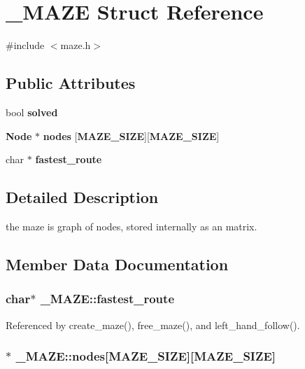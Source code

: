 \section{\-\_\-\-M\-A\-Z\-E Struct Reference}
\label{struct__MAZE}


{\ttfamily \#include $<$maze.\-h$>$}

\subsection*{Public Attributes}
\begin{DoxyCompactItemize}
\item 
bool {\bf solved}
\item 
{\bf Node} $\ast$ {\bf nodes} [{\bf M\-A\-Z\-E\-\_\-\-S\-I\-Z\-E}][{\bf M\-A\-Z\-E\-\_\-\-S\-I\-Z\-E}]
\item 
char $\ast$ {\bf fastest\-\_\-route}
\end{DoxyCompactItemize}


\subsection{Detailed Description}
the maze is graph of nodes, stored internally as an matrix. 

\subsection{Member Data Documentation}
\subsubsection[{fastest\-\_\-route}]{\setlength{\rightskip}{0pt plus 5cm}char$\ast$ \-\_\-\-M\-A\-Z\-E\-::fastest\-\_\-route}\label{struct__MAZE_a7b9247d555d606e8588851f62f6c7de8}


Referenced by create\-\_\-maze(), free\-\_\-maze(), and left\-\_\-hand\-\_\-follow().

\subsubsection[{nodes}]{$\ast$ \-\_\-\-M\-A\-Z\-E\-::nodes[{\bf M\-A\-Z\-E\-\_\-\-S\-I\-Z\-E}][{\bf M\-A\-Z\-E\-\_\-\-S\-I\-Z\-E}]}\label{struct__MAZE_a3c6979d722b6efaed52dd25f0f39ecd4}


